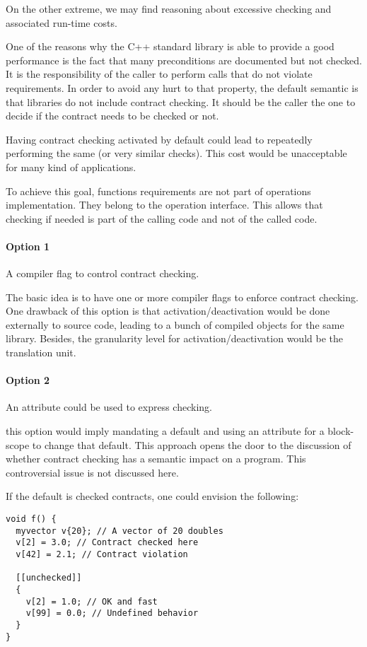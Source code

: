 On the other extreme, we may find reasoning about excessive checking and
associated run-time costs.

One of the reasons why the C++ standard library is able to provide a good
performance is the fact that many preconditions are documented but not checked.
It is the responsibility of the caller to perform calls that do not violate
requirements. In order to avoid any hurt to that property, the default semantic
is that libraries do not include contract checking. It should be the caller the one
to decide if the contract needs to be checked or not. 

Having contract checking activated by default could lead to repeatedly
performing the same (or very similar checks). This cost would be unacceptable
for many kind of applications.

To achieve this goal, functions requirements are not part of operations
implementation.  They belong to the operation interface. This allows that
checking if needed is part of the calling code and not of the called code.


\paragraph{Option 1} A compiler flag to control contract checking.

The basic idea is to have one or more compiler flags to enforce contract
checking. One drawback of this option is that activation/deactivation would be
done externally to source code, leading to a bunch of compiled objects for the
same library. Besides, the granularity level for activation/deactivation would
be the translation unit.

\paragraph{Option 2} An attribute could be used to express checking.

this option would imply mandating a default and using an attribute for a
block-scope to change that default. This approach opens the door to the
discussion of whether contract checking has a semantic impact on a program. This
controversial issue is not discussed here.

If the default is checked contracts, one could envision the following:

\begin{lstlisting}
void f() {
  myvector v{20}; // A vector of 20 doubles
  v[2] = 3.0; // Contract checked here
  v[42] = 2.1; // Contract violation

  [[unchecked]] 
  {
    v[2] = 1.0; // OK and fast
    v[99] = 0.0; // Undefined behavior
  }
}
\end{lstlisting}

